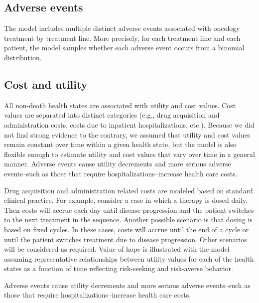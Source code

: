 \documentclass[11pt,final,fleqn]{article}\usepackage[]{graphicx}\usepackage[]{color}
\theoremstyle{plain}
\begin{document}
{\subsection{Adverse events}

The model includes multiple distinct adverse events associated with oncology treatment by treatment line. More precisely, for each treatment line and each patient, the model samples whether each adverse event occurs from a binomial distribution.

\subsection{Cost and utility}

All non-death health states are associated with utility and cost values. Cost values are separated into distinct categories (e.g., drug acquisition and administration costs, costs due to inpatient hospitalizations, etc.). Because we did not find strong evidence to the contrary, we assumed that utility and cost values remain constant over time within a given health state, but the model is also flexible enough to estimate utility and cost values that vary over time in a general manner. Adverse events cause utility decrements and more serious adverse events--such as those that require hospitalizations--increase health care costs. 

Drug acquisition and administration related costs are modeled based on standard clinical practice. For example, consider a case in which a therapy is dosed daily. Then costs will accrue each day until disease progression and the patient switches to the next treatment in the sequence. Another possible scenario is that dosing is based on fixed cycles. In these cases, costs will accrue until the end of a cycle or until the patient switches treatment due to disease progression. Other scenarios will be considered as required. 
Value of hope is illustrated with the model assuming representative relationships between utility values for each of the health states as a function of time reflecting risk-seeking and risk-averse behavior. 

Adverse events cause utility decrements and more serious adverse events--such as those that require hospitalizations--increase health care costs. 

}
\end{document}
